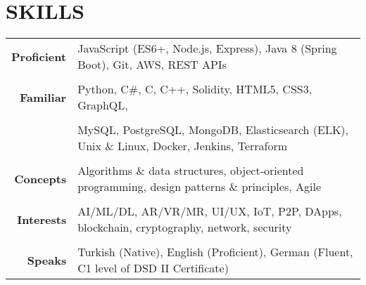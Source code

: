 \documentclass[a4paper, 10pt]{article}
\begin{document}
\section{SKILLS}
{\renewcommand{\arraystretch}{0.7}
\begin{tabular}{r p{15.4cm}}
    \textbf{Proficient} & JavaScript (ES6+, Node.js, Express), Java 8 (Spring Boot), Git, AWS, REST APIs\\\\
    \textbf{Familiar} & Python, C\#, C, C++, Solidity, HTML5, CSS3, GraphQL,\\\\
    & MySQL, PostgreSQL, MongoDB, Elasticsearch (ELK), Unix \& Linux, Docker, Jenkins, Terraform\\\\
    \textbf{Concepts} & Algorithms \& data structures, object-oriented programming, design patterns \& principles, Agile\\\\
    \textbf{Interests} & AI/ML/DL, AR/VR/MR, UI/UX, IoT, P2P, DApps, blockchain, cryptography, network, security\\\\
    \textbf{Speaks} & Turkish (Native), English (Proficient), German (Fluent, C1 level of DSD II Certificate)
\end{tabular}}
\end{document}
